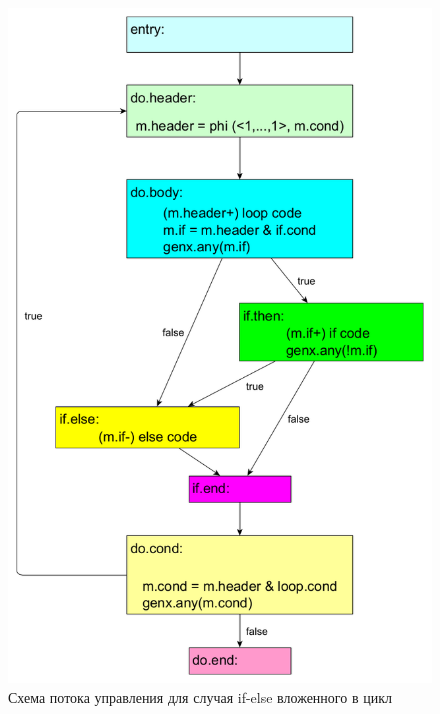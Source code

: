 \begin{figure}
  \centering
  \includegraphics[scale=0.27]{Images/do-while-nested-if-FE-colored.png}
  \caption{Схема потока управления для случая if-else вложенного в цикл}
  \label{fig:loop-nested-if-simdcf}
\end{figure}


